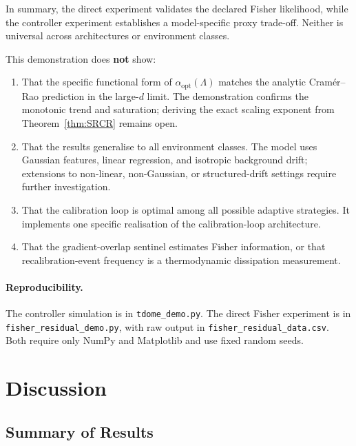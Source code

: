 \documentclass[12pt]{article}
\begin{document}
\noindent
In summary, the direct experiment validates the declared Fisher
likelihood, while the controller experiment establishes a model-specific
proxy trade-off.  Neither is universal across architectures or
environment classes.

\medskip
This demonstration does \textbf{not} show:
\begin{enumerate}
\item That the specific functional form of
  $\alpha_{\mathrm{opt}}(\Lambda)$ matches the analytic
  Cram\'{e}r--Rao prediction in the
  large-$d$ limit.  The demonstration confirms the
  monotonic trend and saturation; deriving the exact
  scaling exponent from Theorem~\ref{thm:SRCR}
  remains open.
\item That the results generalise to all environment
  classes.  The model uses Gaussian features, linear
  regression, and isotropic background drift; extensions
  to non-linear, non-Gaussian, or structured-drift
  settings require further investigation.
\item That the calibration loop is optimal among all
  possible adaptive strategies.  It implements one
  specific realisation of the calibration-loop
  architecture.
\item That the gradient-overlap sentinel estimates Fisher information,
  or that recalibration-event frequency is a thermodynamic dissipation
  measurement.
\end{enumerate}

\paragraph{Reproducibility.}
\begin{sloppypar}
The controller simulation is in \texttt{tdome\_demo.py}.  The direct
Fisher experiment is in \texttt{fisher\_residual\_demo.py}, with raw
output in \texttt{fisher\_residual\_data.csv}.  Both require only NumPy
and Matplotlib and use fixed random seeds.
\end{sloppypar}

\section{Discussion}
\label{sec:discussion}

\subsection{Summary of Results}
\label{subsec:summary}
\end{document}
